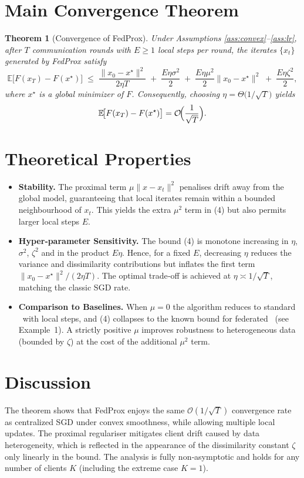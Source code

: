 \documentclass{article}
\newtheorem{theorem}{Theorem}
\newcommand{\EE}{\mathbb{E}}
\newcommand{\prox}{\mu}
\newcommand{\sgd}{\mathrm{SGD}}
\begin{document}
\section*{Main Convergence Theorem}
\begin{theorem}[Convergence of FedProx]\label{thm:main}
Under Assumptions \ref{ass:convex}–\ref{ass:lr}, after $T$ communication rounds
with $E\ge1$ local steps per round, the iterates $\{x_t\}$ generated by
FedProx satisfy
\[
\EE\!\bigl[F(x_T)-F(x^\star)\bigr]
\;\le\;
\frac{\|x_0-x^\star\|^2}{2\eta T}
\;+\;
\frac{E\eta\sigma^2}{2}
\;+\;
\frac{E\eta\prox^2}{2}\|x_0-x^\star\|^2
\;+\;
\frac{E\eta\zeta^2}{2},
\tag{4}
\]
where $x^\star$ is a global minimizer of $F$.
Consequently, choosing $\eta=\Theta\!\bigl(1/\sqrt{T}\bigr)$ yields
\[
\EE\!\bigl[F(x_T)-F(x^\star)\bigr]=\mathcal{O}\!\Bigl(\frac{1}{\sqrt{T}}\Bigr).
\]
\end{theorem}

\section*{Theoretical Properties}
\begin{itemize}
\item \textbf{Stability.} The proximal term $\prox\|x-x_t\|^2$ penalises drift
away from the global model, guaranteeing that local iterates remain
within a bounded neighbourhood of $x_t$. This yields the extra
$\prox^2$ term in (4) but also permits larger local steps $E$.

\item \textbf{Hyper‑parameter Sensitivity.}
The bound (4) is monotone increasing in $\eta$, $\sigma^2$, $\zeta^2$ and
in the product $E\eta$. Hence, for a fixed $E$, decreasing $\eta$ reduces
the variance and dissimilarity contributions but inflates the first term
$\|x_0-x^\star\|^2/(2\eta T)$. The optimal trade‑off is achieved at
$\eta\asymp 1/\sqrt{T}$, matching the classic SGD rate.

\item \textbf{Comparison to Baselines.}
When $\prox=0$ the algorithm reduces to standard \sgd~with local steps,
and (4) collapses to the known bound for federated \sgd\ (see Example~1).
A strictly positive $\prox$ improves robustness to heterogeneous data
(bounded by $\zeta$) at the cost of the additional $\prox^2$ term.
\end{itemize}

\section*{Discussion}
The theorem shows that FedProx enjoys the same $\mathcal{O}(1/\sqrt{T})$
convergence rate as centralized SGD under convex smoothness,
while allowing multiple local updates. The proximal regulariser
mitigates client drift caused by data heterogeneity, which is reflected
in the appearance of the dissimilarity constant $\zeta$ only linearly in
the bound. The analysis is fully non‑asymptotic and holds for any number
of clients $K$ (including the extreme case $K=1$).
\end{document}
